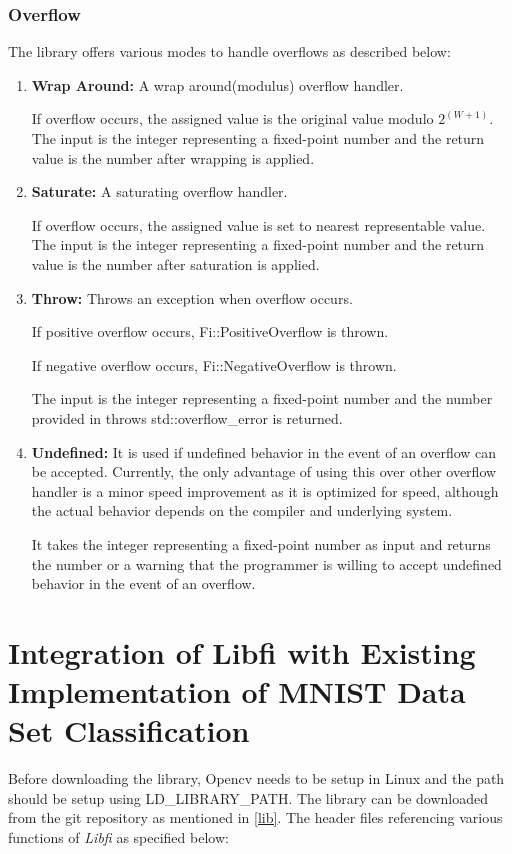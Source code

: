 \subsubsection{Overflow}\label{Overflow Section}
The library offers various modes to handle overflows as described below:
\begin{enumerate}
\item
\textbf{Wrap Around:} A wrap around(modulus) overflow handler. 

\noindent If overflow occurs, the assigned value is the original value modulo $2^{(W+1)}$.
The input is the integer representing a fixed-point number and the return value is the number after wrapping is applied.
\item
\textbf{Saturate:} A saturating overflow handler.

\noindent If overflow occurs, the assigned value is set to nearest representable value. The input is the integer representing a fixed-point number and the return value is the number after saturation is applied.
\item
\textbf{Throw:} Throws an exception when overflow occurs.

\noindent If positive overflow occurs, Fi::PositiveOverflow is thrown.

\noindent If negative overflow occurs, Fi::NegativeOverflow is thrown.

\noindent The input is the integer representing a fixed-point number and the number provided in throws std::overflow\_error is returned.
\item
\textbf{Undefined:} It is used if undefined behavior in the event of an overflow can be accepted. Currently, the only advantage of using this over other overflow handler is a minor speed improvement as it is optimized for speed, although the actual behavior depends on the compiler and underlying system.

\noindent It takes the integer representing a fixed-point number as input and returns the number or a warning that the programmer is willing to accept undefined behavior in the event of an overflow.
\end{enumerate}

\section{Integration of Libfi with Existing Implementation of MNIST Data Set Classification}
Before downloading the library, Opencv needs to be setup in Linux and the path should be setup using LD\_LIBRARY\_PATH.
The library can be downloaded from the git repository as mentioned in \ref{lib}. The header files referencing various functions of \textit{Libfi} as specified below:


